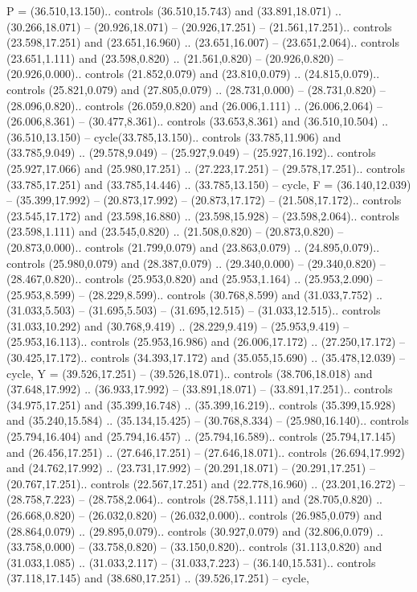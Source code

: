 {P} = {(36.510,13.150).. controls (36.510,15.743) and (33.891,18.071) .. (30.266,18.071) -- (20.926,18.071) -- (20.926,17.251) -- (21.561,17.251).. controls (23.598,17.251) and (23.651,16.960) .. (23.651,16.007) -- (23.651,2.064).. controls (23.651,1.111) and (23.598,0.820) .. (21.561,0.820) -- (20.926,0.820) -- (20.926,0.000).. controls (21.852,0.079) and (23.810,0.079) .. (24.815,0.079).. controls (25.821,0.079) and (27.805,0.079) .. (28.731,0.000) -- (28.731,0.820) -- (28.096,0.820).. controls (26.059,0.820) and (26.006,1.111) .. (26.006,2.064) -- (26.006,8.361) -- (30.477,8.361).. controls (33.653,8.361) and (36.510,10.504) .. (36.510,13.150) -- cycle(33.785,13.150).. controls (33.785,11.906) and (33.785,9.049) .. (29.578,9.049) -- (25.927,9.049) -- (25.927,16.192).. controls (25.927,17.066) and (25.980,17.251) .. (27.223,17.251) -- (29.578,17.251).. controls (33.785,17.251) and (33.785,14.446) .. (33.785,13.150) -- cycle},
{F} = {(36.140,12.039) -- (35.399,17.992) -- (20.873,17.992) -- (20.873,17.172) -- (21.508,17.172).. controls (23.545,17.172) and (23.598,16.880) .. (23.598,15.928) -- (23.598,2.064).. controls (23.598,1.111) and (23.545,0.820) .. (21.508,0.820) -- (20.873,0.820) -- (20.873,0.000).. controls (21.799,0.079) and (23.863,0.079) .. (24.895,0.079).. controls (25.980,0.079) and (28.387,0.079) .. (29.340,0.000) -- (29.340,0.820) -- (28.467,0.820).. controls (25.953,0.820) and (25.953,1.164) .. (25.953,2.090) -- (25.953,8.599) -- (28.229,8.599).. controls (30.768,8.599) and (31.033,7.752) .. (31.033,5.503) -- (31.695,5.503) -- (31.695,12.515) -- (31.033,12.515).. controls (31.033,10.292) and (30.768,9.419) .. (28.229,9.419) -- (25.953,9.419) -- (25.953,16.113).. controls (25.953,16.986) and (26.006,17.172) .. (27.250,17.172) -- (30.425,17.172).. controls (34.393,17.172) and (35.055,15.690) .. (35.478,12.039) -- cycle},
{Y} = {(39.526,17.251) -- (39.526,18.071).. controls (38.706,18.018) and (37.648,17.992) .. (36.933,17.992) -- (33.891,18.071) -- (33.891,17.251).. controls (34.975,17.251) and (35.399,16.748) .. (35.399,16.219).. controls (35.399,15.928) and (35.240,15.584) .. (35.134,15.425) -- (30.768,8.334) -- (25.980,16.140).. controls (25.794,16.404) and (25.794,16.457) .. (25.794,16.589).. controls (25.794,17.145) and (26.456,17.251) .. (27.646,17.251) -- (27.646,18.071).. controls (26.694,17.992) and (24.762,17.992) .. (23.731,17.992) -- (20.291,18.071) -- (20.291,17.251) -- (20.767,17.251).. controls (22.567,17.251) and (22.778,16.960) .. (23.201,16.272) -- (28.758,7.223) -- (28.758,2.064).. controls (28.758,1.111) and (28.705,0.820) .. (26.668,0.820) -- (26.032,0.820) -- (26.032,0.000).. controls (26.985,0.079) and (28.864,0.079) .. (29.895,0.079).. controls (30.927,0.079) and (32.806,0.079) .. (33.758,0.000) -- (33.758,0.820) -- (33.150,0.820).. controls (31.113,0.820) and (31.033,1.085) .. (31.033,2.117) -- (31.033,7.223) -- (36.140,15.531).. controls (37.118,17.145) and (38.680,17.251) .. (39.526,17.251) -- cycle},
